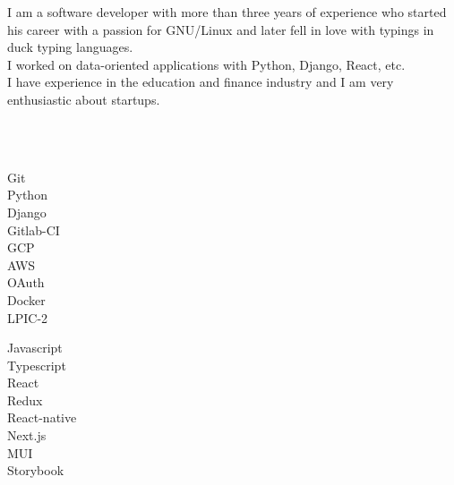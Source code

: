 \documentclass[9pt]{developercv}
\begin{document}
\begin{minipage}[t]{1\textwidth}
	\vspace{-\baselineskip}
	I am a software developer with more than three years of experience who started his career with a passion for GNU/Linux and later fell in love with typings in duck typing languages.\\
	I worked on data-oriented applications with Python, Django, React, etc. \\
	I have experience in the education and finance industry and I am very enthusiastic about startups.
\end{minipage}

\\\\
\begin{minipage}[t]{0.49\textwidth}
	\Large
	\vspace{-\baselineskip}

	\faCircle \; {Git}\\
	\faCircle \; {Python}\\
	\faCircle \; {Django}\\
	\faCircle \; {Gitlab-CI}\\
	\faCircle \; {GCP}\\
	\faCircle \; {AWS}\\
	\faCircle \; {OAuth}\\
	\faCircle \; {Docker}\\
	\faCircle \; {LPIC-2}\\
\end{minipage}
\begin{minipage}[t]{0.50\textwidth}
	\Large
	\vspace{-\baselineskip}

	\faCircle \; {Javascript}\\
	\faCircle \; {Typescript}\\
	\faCircle \; {React}\\
	\faCircle \; {Redux}\\
	\faCircle \; {React-native}\\
	\faCircle \; {Next.js}\\
	\faCircle \; {MUI}\\
	\faCircle \; {Storybook}\\
\end{minipage}
\end{document}
